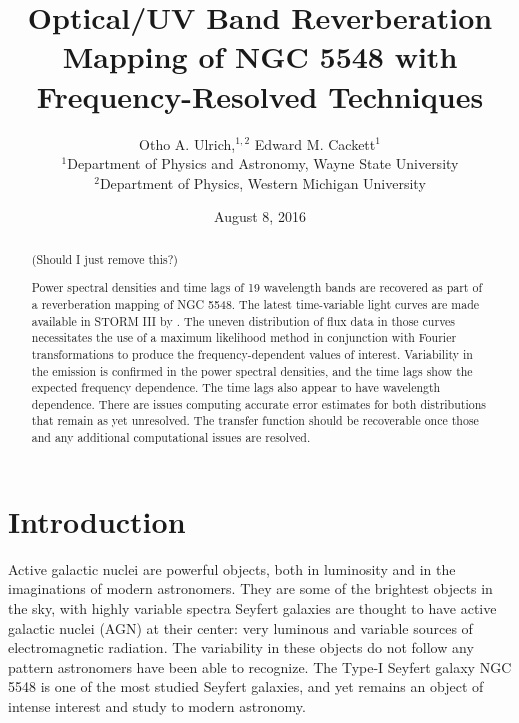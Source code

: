 \documentclass[11pt,letterpaper]{article}
\begin{document}
\title{Optical/UV Band
Reverberation Mapping of NGC 5548 with Frequency-Resolved Techniques}

\author{Otho A. Ulrich,$^{1,2}$ Edward M. Cackett$^{1}$
\\
$^{1}$Department of Physics and Astronomy, Wayne State University\\
$^{2}$Department of Physics, Western Michigan University\\
}
\date{August 8, 2016}

\maketitle

\begin{abstract}

(Should I just remove this?)

Power spectral densities and time lags of 19 wavelength bands are recovered as part of a reverberation mapping of NGC 5548. The latest time-variable light curves are made available in STORM III by \cite{2016ApJ...821...56F}. The uneven distribution of flux data in those curves necessitates the use of a maximum likelihood method in conjunction with Fourier transformations to produce the frequency-dependent values of interest. Variability in the emission is confirmed in the power spectral densities, and the time lags show the expected frequency dependence. The time lags also appear to have wavelength dependence. There are issues computing accurate error estimates for both distributions that remain as yet unresolved. The transfer function should be recoverable once those and any additional computational issues are resolved.

\end{abstract}

\section{Introduction}

Active galactic nuclei are powerful objects, both in luminosity and in the imaginations of modern astronomers. They are some of the brightest objects in the sky, with highly variable spectra 
Seyfert galaxies are thought to have active galactic nuclei (AGN) at their center: very luminous and variable sources of electromagnetic radiation. The variability in these objects do not follow any pattern astronomers have been able to recognize. The Type-I Seyfert galaxy NGC 5548 is one of the most studied Seyfert galaxies, and yet remains an object of intense interest and study to modern astronomy. 
\end{document}
